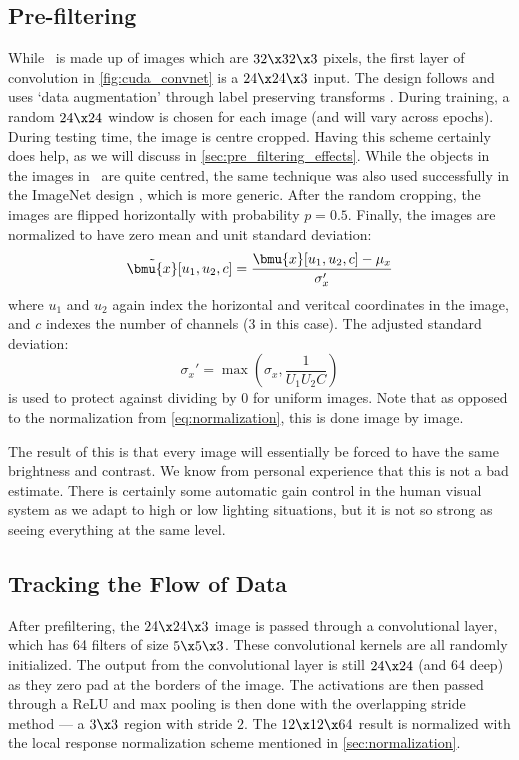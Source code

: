 \subsection{Pre-filtering}
  While \cifar\ is made up of images which are $32 \x 32 \x 3$ pixels, the first
  layer of convolution in \autoref{fig:cuda_convnet} is a $24 \x 24 \x 3$
  input.  The design follows \cite{krizhevsky_imagenet_2012} and uses `data
  augmentation' through label preserving transforms \cite{simard_best_2003}.
  During training, a random $24\x24$ window is chosen for each image (and will
  vary across epochs). During testing time, the image is centre cropped.
  Having this scheme certainly does help, as we will discuss in
  \autoref{sec:pre_filtering_effects}.  While the objects in the images in
  \cifar\ are quite centred, the same technique was also used successfully in
  the ImageNet design \cite{krizhevsky_imagenet_2012}, which is more generic.
  After the random cropping, the images are flipped horizontally with
  probability $p=0.5$. Finally, the images are normalized to have zero mean and
  unit standard deviation:
  \begin{equation}
    \tilde{\bmu{x}}[u_1,u_2,c] =  \frac{\bmu{x}[u_1, u_2, c] - \mu_x}{\sigma_x'}
  \end{equation}
  where $u_1$ and $u_2$ again index the horizontal and veritcal coordinates in the
  image, and $c$ indexes the number of channels ($3$ in this case). The
  adjusted standard deviation:
  $$\sigma_x' = \max\left(\sigma_x, \frac{1}{U_1U_2C}\right)$$
  is used to protect against dividing by 0 for uniform images. Note that as
  opposed to the normalization from \autoref{eq:normalization}, this is done
  image by image. 
  
  The result of this is that every image will essentially be forced to have the
  same brightness and contrast. We know from personal
  experience that this is not a bad estimate. There is certainly some
  automatic gain control in the human visual system as we adapt to high or low
  lighting situations, but it is not so strong as seeing everything at the same
  level.

\subsection{Tracking the Flow of Data}
  After prefiltering, the $24\x 24\x 3$ image is passed through a convolutional
  layer, which has 64 filters of size $5 \x 5 \x 3$. These convolutional
  kernels are all randomly initialized. The output from the convolutional layer
  is still $24\x 24$ (and 64 deep) as they zero pad at the borders of the
  image. The activations are then passed through a ReLU and max pooling is then
  done with the overlapping stride method --- a $3 \x 3$ region with stride
  $2$. The $12 \x 12 \x 64$ result is normalized with the local response
  normalization scheme mentioned in \autoref{sec:normalization}. 

